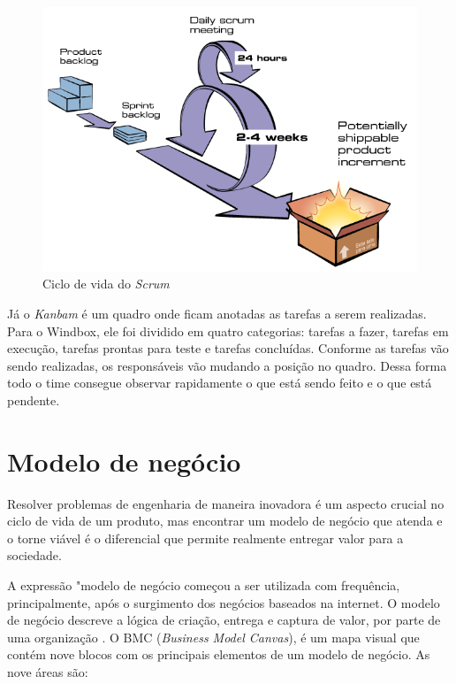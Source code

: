\begin{figure}[htbp!] \begin{center}
\includegraphics[width=0.75\linewidth]{./figuras/scrum-diagrama}
\caption{Ciclo de vida do \textit{Scrum}}
\label{Fig:cicloScrum}
\end{center} 
\end{figure}

Já o \textit{Kanbam} é um quadro onde ficam anotadas as tarefas a serem realizadas. Para o Windbox, ele foi dividido em quatro categorias: tarefas a fazer, tarefas em execução, tarefas prontas para teste e tarefas concluídas. Conforme as tarefas vão sendo realizadas, os responsáveis vão mudando a posição no quadro. Dessa forma todo o time consegue observar rapidamente o que está sendo feito e o que está pendente.

\section{Modelo de negócio}
\label{Sec:modeloDeNegocio}

Resolver problemas de engenharia de maneira inovadora é um aspecto crucial no ciclo de vida de um produto, mas encontrar um modelo de negócio que atenda e o torne viável é o diferencial que permite realmente entregar valor para a sociedade.

A expressão "modelo de negócio começou a ser utilizada com frequência, principalmente, após o surgimento dos negócios baseados na internet. O modelo de negócio descreve a lógica de criação, entrega e captura de valor, por parte de uma organização \cite{business-model-generation}. O BMC (\textit{Business Model Canvas}), é um mapa visual que contém nove blocos com os principais elementos de um modelo de negócio. As nove áreas são:

